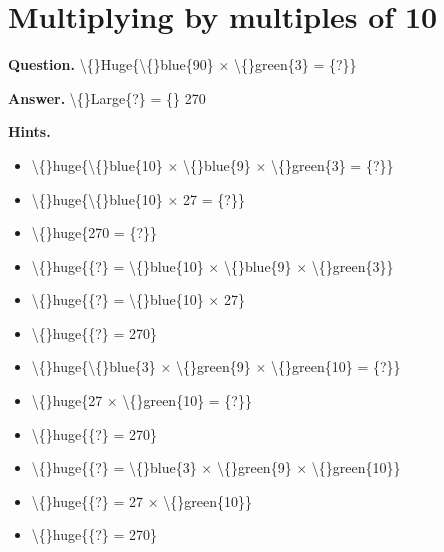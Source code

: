 \documentclass{article}
\begin{document}
\section*{Multiplying by multiples of 10}
\textbf{Question.} \textbackslash\{\}Huge\{\textbackslash\{\}blue\{90\} $\times$ \textbackslash\{\}green\{3\} = \{?\}\}

\textbf{Answer.} \textbackslash\{\}Large\{?\} = \{\}
            270

\textbf{Hints.}
\begin{itemize}
  \item \textbackslash\{\}huge\{\textbackslash\{\}blue\{10\} $\times$ \textbackslash\{\}blue\{9\} $\times$ \textbackslash\{\}green\{3\} = \{?\}\}
  \item \textbackslash\{\}huge\{\textbackslash\{\}blue\{10\} $\times$ 27 = \{?\}\}
  \item \textbackslash\{\}huge\{270 = \{?\}\}
  \item \textbackslash\{\}huge\{\{?\} = \textbackslash\{\}blue\{10\} $\times$ \textbackslash\{\}blue\{9\} $\times$ \textbackslash\{\}green\{3\}\}
  \item \textbackslash\{\}huge\{\{?\} = \textbackslash\{\}blue\{10\} $\times$ 27\}
  \item \textbackslash\{\}huge\{\{?\} = 270\}
  \item \textbackslash\{\}huge\{\textbackslash\{\}blue\{3\} $\times$ \textbackslash\{\}green\{9\} $\times$ \textbackslash\{\}green\{10\} = \{?\}\}
  \item \textbackslash\{\}huge\{27 $\times$ \textbackslash\{\}green\{10\} = \{?\}\}
  \item \textbackslash\{\}huge\{\{?\} = 270\}
  \item \textbackslash\{\}huge\{\{?\} = \textbackslash\{\}blue\{3\} $\times$ \textbackslash\{\}green\{9\} $\times$ \textbackslash\{\}green\{10\}\}
  \item \textbackslash\{\}huge\{\{?\} = 27 $\times$ \textbackslash\{\}green\{10\}\}
  \item \textbackslash\{\}huge\{\{?\} = 270\}
\end{itemize}
\end{document}
